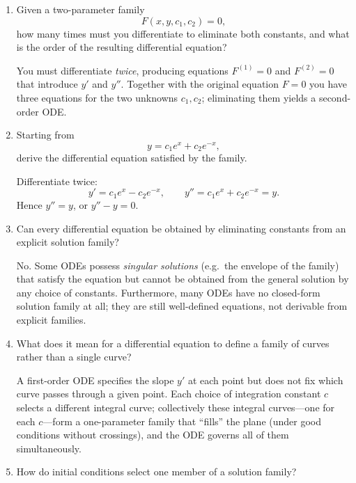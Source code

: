 \documentclass{self-check}
\begin{document}
\begin{enumerate}[leftmargin=*, itemsep=8pt]
    \begin{answer}
      The IFT hypothesis fails; we can no longer guarantee a local smooth branch \(y=f(x)\) near such a point. Geometrically, these are \emph{singular points}: the tangent line may be vertical (if \(F_{x}\neq 0\)), or the curve may cross itself, develop a cusp, or be isolated. The implicit-derivative formula \(-F_{x}/F_{y}\) is undefined there.
    \end{answer}
  \item Given a two-parameter family
    \[ F(x,y,c_{1},c_{2})=0, \]
    how many times must you differentiate to eliminate both constants, and what is the order of the resulting differential equation?

    \begin{answer}
      You must differentiate \emph{twice}, producing equations \(F^{(1)}=0\) and \(F^{(2)}=0\) that introduce \(y'\) and \(y''\). Together with the original equation \(F=0\) you have three equations for the two unknowns \(c_{1},c_{2}\); eliminating them yields a second-order ODE.
    \end{answer}
  \item Starting from
    \[ y=c_{1}e^{x}+c_{2}e^{-x}, \]
    derive the differential equation satisfied by the family.

    \begin{answer}
      Differentiate twice:
      \[ y' = c_{1} e^{x} - c_{2} e^{-x}, \qquad y'' = c_{1} e^{x} + c_{2} e^{-x}= y. \]
      Hence \(y'' = y\), or \(y''-y=0\).
    \end{answer}
  \item Can every differential equation be obtained by eliminating constants from an explicit solution family?

    \begin{answer}
      No. Some ODEs possess \emph{singular solutions} (e.g.\ the envelope of the family) that satisfy the equation but cannot be obtained from the general solution by any choice of constants. Furthermore, many ODEs have no closed-form solution family at all; they are still well-defined equations, not derivable from explicit families.
    \end{answer}
  \item What does it mean for a differential equation to define a family of curves rather than a single curve?

    \begin{answer}
      A first-order ODE specifies the slope \(y'\) at each point but does not fix which curve passes through a given point. Each choice of integration constant \(c\) selects a different integral curve; collectively these integral curves---one for each \(c\)---form a one-parameter family that ``fills'' the plane (under good conditions without crossings), and the ODE governs all of them simultaneously.
    \end{answer}
  \item How do initial conditions select one member of a solution family?


\end{enumerate}
\end{document}
